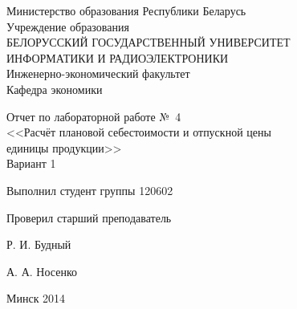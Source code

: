 \thispagestyle{empty}
\setlength{\parindent}{0ex} %

\begin{center}
  Министерство образования Республики Беларусь \\
  \smallskip
  Учреждение образования \\
  БЕЛОРУССКИЙ ГОСУДАРСТВЕННЫЙ УНИВЕРСИТЕТ \\
  ИНФОРМАТИКИ И РАДИОЭЛЕКТРОНИКИ \\
  \smallskip
  Инженерно-экономический факультет \\
  \smallskip
  Кафедра экономики
\end{center}

\vspace{40mm}

\begin{center}
  Отчет по лабораторной работе №~4 \\
  <<Расчёт плановой себестоимости и отпускной цены \\
  единицы продукции>> \\
  Вариант 1
\end{center}

\vspace{60mm}

\begin{minipage}{.55\linewidth}

  Выполнил студент группы 120602

  \smallskip

  Проверил старший преподаватель

\end{minipage}
\hfill
\begin{minipage}{.4\linewidth}
  \begin{flushright}

    Р. И. Будный

    \smallskip

    А. А. Носенко

  \end{flushright}
\end{minipage}

\vspace{49mm}

\begin{center}

  Минск 2014

\end{center}

\setlength{\parindent}{5ex} %
